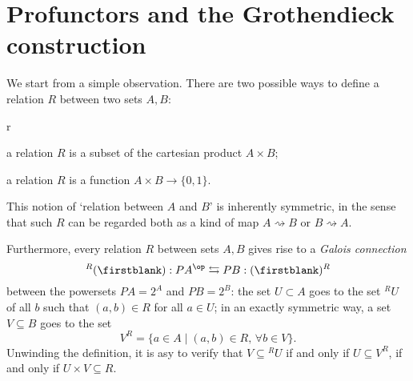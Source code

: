 \section{Profunctors and the Gro\-then\-dieck construction}
\label{sec:org7dd09e1}
We start from a simple observation.
There are two possible ways to define a relation $R$ between two sets $A,B$:
\begin{enumtag}{r}
	\item \label{r_1} a relation $R$ is a subset of the cartesian product $A\times B$;
	\item \label{r_2} a relation $R$ is a function $A\times B \to \{0,1\}$.
\end{enumtag}
This notion of `relation between $A$ and $B$' is inherently symmetric, in the sense that such $R$ can be regarded both as a kind of map $A \rightsquigarrow B$ or $B\rightsquigarrow A$.

Furthermore, every relation $R$ between sets $A,B$ gives rise to a \emph{Galois connection}
\[{}^R(\firstblank) :PA^\op \leftrightarrows PB : (\firstblank)^R \label{adjunzia} \]
between the powersets $PA=2^A$ and $PB = 2^B$: the set $U\subset A$ goes to the set ${}^RU$ of all $b$ such that $(a,b)\in R$ for all $a\in U$; in an exactly symmetric way, a set $V\subseteq B$ goes to the set
\[V^R = \{a\in A\mid (a,b) \in R,\, \forall b\in V\}.\]
Unwinding the definition, it is asy to verify that $V\subseteq{}^RU$ if and only if $U\subseteq V^R$, if and only if $U\times V\subseteq R$.

